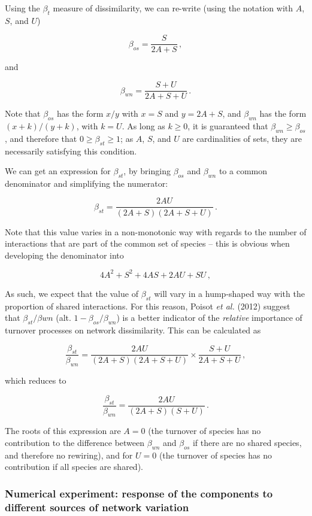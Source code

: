 \documentclass[11pt]{article}
\begin{document}
Using the \(\beta_t\) measure of dissimilarity, we can re-write (using
the notation with \(A\), \(S\), and \(U\))

\[\beta_{os} = \frac{S}{2A+S}\,,\]

and

\[\beta_{wn} = \frac{S+U}{2A+S+U}\,.\]

Note that \(\beta_{os}\) has the form \(x/y\) with \(x = S\) and
\(y = 2A+S\), and \(\beta_{wn}\) has the form \((x+k)/(y+k)\), with
\(k = U\). As long as \(k \ge 0\), it is guaranteed that
\(\beta_{wn} \ge \beta_{os}\), and therefore that
\(0 \ge \beta_{st} \ge 1\); as \(A\), \(S\), and \(U\) are cardinalities
of sets, they are necessarily satisfying this condition.

We can get an expression for \(\beta_{st}\), by bringing \(\beta_{os}\)
and \(\beta_{wn}\) to a common denominator and simplifying the
numerator:

\[\beta_{st} = \frac{2AU}{(2A+S)(2A+S+U)}\,.\]

Note that this value varies in a non-monotonic way with regards to the
number of interactions that are part of the common set of species --
this is obvious when developing the denominator into

\[4A^2 + S^2 + 4AS + 2AU + SU\,,\]

As such, we expect that the value of \(\beta_{st}\) will vary in a
hump-shaped way with the proportion of shared interactions. For this
reason, Poisot \emph{et al.} (2012) suggest that
\(\beta_{st}/\beta{wn}\) (alt. \(1-\beta_{os}/\beta_{wn}\)) is a better
indicator of the \emph{relative} importance of turnover processes on
network dissimilarity. This can be calculated as

\[\frac{\beta_{st}}{\beta_{wn}} = \frac{2AU}{(2A+S)(2A+S+U)}\times\frac{S+U}{2A+S+U}\,,\]

which reduces to

\[\frac{\beta_{st}}{\beta_{wn}} = \frac{2AU}{(2A+S)(S+U)}\,.\]

The roots of this expression are \(A=0\) (the turnover of species has no
contribution to the difference between \(\beta_{wn}\) and \(\beta_{os}\)
if there are no shared species, and therefore no rewiring), and for
\(U = 0\) (the turnover of species has no contribution if all species
are shared).

\hypertarget{numerical-experiment-response-of-the-components-to-different-sources-of-network-variation}{%
\subsubsection{Numerical experiment: response of the components to
different sources of network
variation}\label{numerical-experiment-response-of-the-components-to-different-sources-of-network-variation}}
\end{document}
